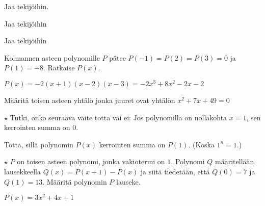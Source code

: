 \begin{tehtavasivu}
\begin{tehtava}
	Jaa tekijöihin.
	\begin{vastaus}
	\end{vastaus}
\end{tehtava}

\begin{tehtava}
Jaa tekijöihin
\begin{vastaus}
\end{vastaus}
\end{tehtava}

\begin{tehtava}
    Jaa tekijöihin
    \begin{vastaus}
    \end{vastaus}
\end{tehtava}

\begin{tehtava}
    Kolmannen asteen polynomille $P$ pätee $P(-1)=P(2)=P(3)=0$ ja $P(1)=-8$. Ratkaise $P(x)$.
    \begin{vastaus}
        $P(x)=-2(x+1)(x-2)(x-3)=-2x^3+8x^2-2x-2$
    \end{vastaus}
\end{tehtava}

\begin{tehtava}
   Määritä toisen asteen yhtälö jonka juuret ovat yhtälön $ x^2+7x+49 =0 $ 
    \begin{vastaus}
    \end{vastaus}
\end{tehtava}

\begin{tehtava}
    $\star $ Tutki, onko seuraava väite totta vai ei: Jos polynomilla on nollakohta $x=1$, sen kerrointen summa on $0$. 
    \begin{vastaus}
        Totta, sillä polynomin $P(x)$ kerrointen summa on $P(1)$. (Koska $1^n=1$.)
    \end{vastaus}
\end{tehtava}

\begin{tehtava}
    $\star$ $P$ on toisen asteen polynomi, jonka vakiotermi on $1$. Polynomi $Q$ määritellään lausekkeella $Q(x)=P(x+1)-P(x)$ ja siitä tiedetään, että $Q(0)=7$ ja $Q(1)=13$. Määritä polynomin $P$ lauseke.
    \begin{vastaus}
        $P(x) = 3x^2+4x+1$
    \end{vastaus}
\end{tehtava}

\end{tehtavasivu}